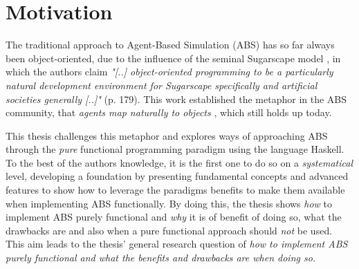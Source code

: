 \chapter{Motivation}
\label{ch:motivation}






The traditional approach to Agent-Based Simulation (ABS) has so far always been object-oriented, due to the influence of the seminal Sugarscape model \cite{epstein_growing_1996}, in which the authors claim \textit{"[..] object-oriented programming to be a particularly natural development environment for Sugarscape specifically and artificial societies generally [..]"} (p. 179). This work established the metaphor in the ABS community, that \textit{agents map naturally to objects} \cite{north_managing_2007}, which still holds up today. %

This thesis challenges this metaphor and explores ways of approaching ABS through the \textit{pure} functional programming paradigm using the language Haskell. To the best of the authors knowledge, it is the first one to do so on a \textit{systematical} level, developing a foundation by presenting fundamental concepts and advanced features to show how to leverage the paradigms benefits \cite{hudak_history_2007} to make them available when implementing ABS functionally. By doing this, the thesis shows \textit{how} to implement ABS purely functional and \textit{why} it is of benefit of doing so, what the drawbacks are and also when a pure functional approach should \textit{not} be used. This aim leads to the thesis' general research question of \textit{how to implement ABS purely functional and what the benefits and drawbacks are when doing so.} 

